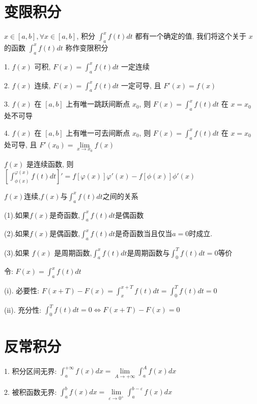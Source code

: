 \section{变限积分}
\begin{definition}[变限积分]
	$x\in[a,b],\forall x\in[a,b]$, 积分 $\int_{a}^{x}f(t)dt$ 都有一个确定的值, 我们将这个关于 $x$ 的函数 $\int_{a}^{x}f(t)dt$ 称作变限积分
\end{definition}
\begin{corollary}[变限积分]
	1. $f(x)$ 可积, $F(x) = \int_{a}^{x}f(t)dt$ 一定连续

	2. $f(x)$ 连续, $F(x) = \int_{a}^{x}f(t)dt$ 一定可导, 且 $F'(x) = f(x)$

	3. $f(x)$ 在 $[a,b]$ 上有唯一跳跃间断点 $x_{0}$, 则 $F(x) = \int_{a}^{x}f(t)dt$ 在 $x=x_{0}$ 处不可导

	4. $f(x)$ 在 $[a,b]$ 上有唯一可去间断点 $x_{0}$, 则 $F(x) = \int_{a}^{x}f(t)dt$ 在 $x=x_{0}$ 处可导, 且 $F'(x_{0}) = \lim\limits_{x\to x_{0}}f(x)$
\end{corollary}
\begin{theorem}[变限积分的导数]
	$f(x)$ 是连续函数, 则 $\left[\int_{\phi(x)}^{\varphi(x)}f(t)dt\right]' = f[\varphi(x)]\varphi'(x) - f[\phi(x)]\phi'(x)$
\end{theorem}
\begin{corollary}[变上限积分奇偶性和周期性与原函数关系]\label{cor: 变上限积分奇偶性和周期性与原函数关系}
	$f(x)$连续,$f(x)$与$\int_{a}^{x} f(t)dt$之间的关系
	
	(1).如果$f(x)$是奇函数,$\int_{a}^{x}f(t)dt$是偶函数
	
	(2).如果$f(x)$是偶函数,$\int_{a}^{x}f(t)dt$是奇函数当且仅当$a=0$时成立.
	
	(3).如果 $f(x)$ 是周期函数,$\int_{a}^{x}f(t)dt\text{是周期函数与}\int_{0}^{T}f(t)dt=0\text{等价}$
	\begin{anymark}[证明]
		令: $F(x)=\int_{a}^{x}f(t)dt$

		(i). 必要性: $F(x+T)-F(x)=\int_{x}^{x+T}f(t)dt=\int_{0}^{T}f(t)dt=0$

		(ii). 充分性: $\int_{0}^{T}f(t)dt=0\Leftrightarrow F(x+T)-F(x)=0$
	\end{anymark}
\end{corollary}

\section{反常积分}

\begin{definition}[反常积分]
	1. 积分区间无界: $\int_{a}^{+\infty}f(x)dx = \lim\limits_{A\to +\infty}\int_{a}^{A}f(x)dx$

	2. 被积函数无界: $\int_{a}^{b}f(x)dx = \lim\limits_{\varepsilon\to 0^{+}}\int_{a}^{b-\varepsilon}f(x)dx$
\end{definition}
